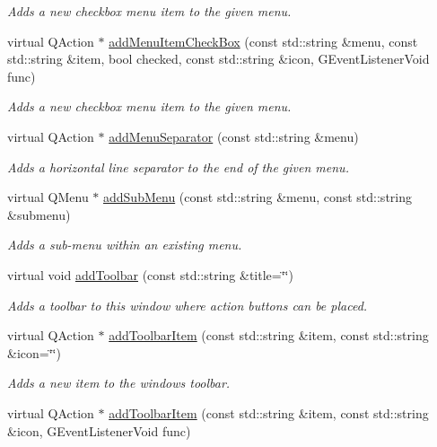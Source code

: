 \begin{DoxyCompactItemize}
\begin{DoxyCompactList}\small\item\em Adds a new checkbox menu item to the given menu. \end{DoxyCompactList}\item 
virtual Q\+Action $\ast$ \mbox{\hyperlink{classGWindow_aab18d66dc7ed71468da3611b28450995}{add\+Menu\+Item\+Check\+Box}} (const std\+::string \&menu, const std\+::string \&item, bool checked, const std\+::string \&icon, G\+Event\+Listener\+Void func)
\begin{DoxyCompactList}\small\item\em Adds a new checkbox menu item to the given menu. \end{DoxyCompactList}\item 
virtual Q\+Action $\ast$ \mbox{\hyperlink{classGWindow_abdf4f167a7135e31ecb8f3363fddfd19}{add\+Menu\+Separator}} (const std\+::string \&menu)
\begin{DoxyCompactList}\small\item\em Adds a horizontal line separator to the end of the given menu. \end{DoxyCompactList}\item 
virtual Q\+Menu $\ast$ \mbox{\hyperlink{classGWindow_a557f7b2372831420546b73239027d2ae}{add\+Sub\+Menu}} (const std\+::string \&menu, const std\+::string \&submenu)
\begin{DoxyCompactList}\small\item\em Adds a sub-\/menu within an existing menu. \end{DoxyCompactList}\item 
virtual void \mbox{\hyperlink{classGWindow_ab523bda15e486bc3c968059c8b23a8d9}{add\+Toolbar}} (const std\+::string \&title=\char`\"{}\char`\"{})
\begin{DoxyCompactList}\small\item\em Adds a toolbar to this window where action buttons can be placed. \end{DoxyCompactList}\item 
virtual Q\+Action $\ast$ \mbox{\hyperlink{classGWindow_ac34ab48bd20d31312ccbf90b7120c5bb}{add\+Toolbar\+Item}} (const std\+::string \&item, const std\+::string \&icon=\char`\"{}\char`\"{})
\begin{DoxyCompactList}\small\item\em Adds a new item to the window\textquotesingle{}s toolbar. \end{DoxyCompactList}\item 
virtual Q\+Action $\ast$ \mbox{\hyperlink{classGWindow_a2fceadd3b04b459bb16e560b095eb93d}{add\+Toolbar\+Item}} (const std\+::string \&item, const std\+::string \&icon, G\+Event\+Listener\+Void func)

\end{DoxyCompactItemize}
